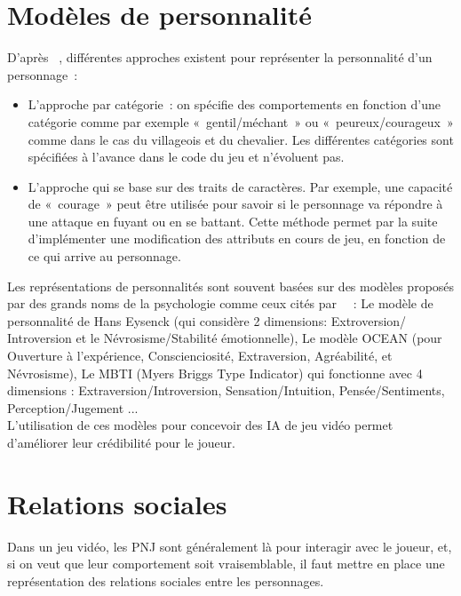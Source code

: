 \documentclass[asi]{picINSAIA}
\begin{document}
\section{Modèles de personnalité}
D'après ~\cite{ochs2009simulation}, différentes approches existent pour représenter la personnalité d'un personnage :
\begin{itemize}
\item L'approche par catégorie : on spécifie des comportements en fonction d'une catégorie comme par exemple « gentil/méchant » ou « peureux/courageux » comme dans le cas du villageois et du chevalier. Les différentes catégories sont spécifiées à l'avance dans le code du jeu et n'évoluent pas.
\item L'approche qui se base sur des traits de caractères. Par exemple, une capacité de « courage » peut être utilisée pour savoir si le personnage va répondre à une attaque en fuyant ou en se battant. Cette méthode permet par la suite d'implémenter une modification des attributs en cours de jeu, en fonction de ce qui arrive au personnage.  
\end{itemize}
Les représentations de personnalités sont souvent basées sur des modèles proposés par des grands noms de la psychologie comme ceux cités par ~\cite{ochs2009simulation} : Le modèle de personnalité de Hans Eysenck (qui considère 2 dimensions: Extroversion/ Introversion et le Névrosisme/Stabilité émotionnelle), Le modèle OCEAN (pour Ouverture à l'expérience, Conscienciosité, Extraversion, Agréabilité, et Névrosisme), Le MBTI (Myers Briggs Type Indicator) qui fonctionne avec 4 dimensions : Extraversion/Introversion, Sensation/Intuition, Pensée/Sentiments, Perception/Jugement ... \\
L'utilisation de ces modèles pour concevoir des IA de jeu vidéo permet d'améliorer leur crédibilité pour le joueur.

\section{Relations sociales}
Dans un jeu vidéo, les PNJ sont généralement là pour interagir avec le joueur, et, si on veut que leur comportement soit vraisemblable, il faut mettre en place une représentation des relations sociales entre les personnages. \\
\end{document}
